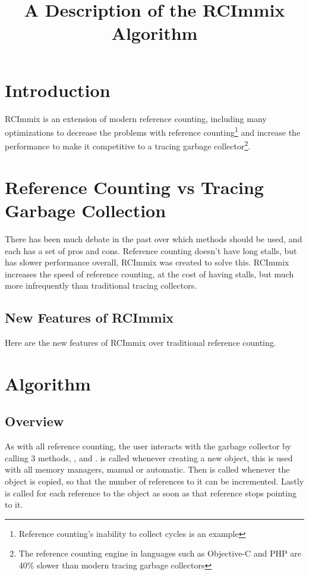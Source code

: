 \documentclass{article}
\title{A Description of the RCImmix Algorithm}
\begin{document}
\section{Introduction}

RCImmix is an extension of modern reference counting, including many optimizations to decrease the problems with reference counting\footnote{Reference counting's inability to collect cycles is an example} and increase the performance to make it competitive to a tracing garbage collector\footnote{The reference counting engine in languages such as Objective-C and PHP are 40\% slower than modern tracing garbage collectors}.

\section{Reference Counting vs Tracing Garbage Collection}

There has been much debate in the past over which methods should be used, and each has a set of pros and cons. Reference counting doesn't have long stalls, but has slower performance overall, RCImmix was created to solve this. RCImmix increases the speed of reference counting, at the cost of having stalls, but much more infrequently than traditional tracing collectors.

\subsection{New Features of RCImmix}

Here are the new features of RCImmix over traditional reference counting.

\begin{itemize}

\end{itemize}


\section{Algorithm}

\subsection{Overview}

As with all reference counting, the user interacts with the garbage collector by calling 3 methods, ,  and .  is called whenever creating a new object, this is used with all memory managers, manual or automatic. Then  is called whenever the object is copied, so that the number of references to it can be incremented. Lastly  is called for each reference to the object as soon as that reference stops pointing to it.
\end{document}
